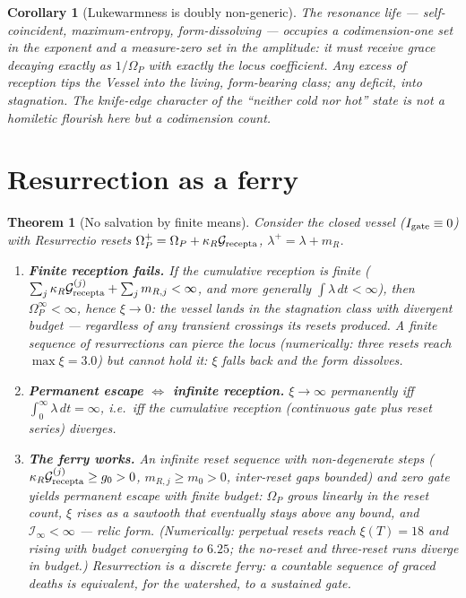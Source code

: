 \documentclass[11pt,a4paper,oneside]{book}
\newcommand{\Op}{\Omega_P}
\newcommand{\Grec}{\mathcal G_{\rm recepta}}
\newcommand{\Igate}{I_{\rm gate}}
\newcommand{\Ib}{\mathcal I}
\theoremstyle{plain}
\newtheorem{corollary}{Corollary}[chapter]
\newtheorem{theorem}{Theorem}[chapter]
\theoremstyle{definition}
\theoremstyle{remark}
\begin{document}
\begin{corollary}[Lukewarmness is doubly non-generic]
The resonance life --- self-coincident, maximum-entropy, form-dissolving --- occupies a
codimension-one set in the exponent \emph{and} a measure-zero set in the amplitude: it must receive
grace decaying exactly as $1/\Op$ with exactly the locus coefficient. Any excess of reception tips the
Vessel into the living, form-bearing class; any deficit, into stagnation. The knife-edge character of
the ``neither cold nor hot'' state is not a homiletic flourish here but a codimension count.
\end{corollary}

\section{Resurrection as a ferry}

\begin{theorem}[No salvation by finite means]\label{separatrix:thm:ferry}
Consider the closed vessel ($\Igate\equiv0$) with Resurrectio resets
$\Op^{+}=\Op+\kappa_R\Grec$, $\lambda^{+}=\lambda+m_R$.
\begin{enumerate}[label=(\roman*),leftmargin=1.8em,itemsep=2pt]
\item \textbf{Finite reception fails.} If the cumulative reception is finite
($\sum_j\kappa_R\Grec^{(j)}+\sum_jm_{R,j}<\infty$, and more generally $\int\lambda\,dt<\infty$), then
$\Op^{\infty}<\infty$, hence $\xi\to0$: the vessel lands in the stagnation class with divergent budget
--- \emph{regardless of any transient crossings} its resets produced. A finite sequence of
resurrections can pierce the locus (numerically: three resets reach $\max\xi=3.0$) but cannot hold
it: $\xi$ falls back and the form dissolves.
\item \textbf{Permanent escape $\iff$ infinite reception.} $\xi\to\infty$ permanently iff
$\int_0^\infty\lambda\,dt=\infty$, i.e.\ iff the cumulative reception (continuous gate plus reset
series) diverges.
\item \textbf{The ferry works.} An infinite reset sequence with non-degenerate steps
($\kappa_R\Grec^{(j)}\ge g_0>0$, $m_{R,j}\ge m_0>0$, inter-reset gaps bounded) and \emph{zero gate}
yields permanent escape with finite budget: $\Op$ grows linearly in the reset count, $\xi$ rises as a
sawtooth that eventually stays above any bound, and $\Ib_\infty<\infty$ --- relic form. (Numerically:
perpetual resets reach $\xi(T)=18$ and rising with budget converging to $6.25$; the no-reset and
three-reset runs diverge in budget.) Resurrection is a \emph{discrete ferry}: a countable sequence of
graced deaths is equivalent, for the watershed, to a sustained gate.
\end{enumerate}
\end{theorem}
\end{document}

